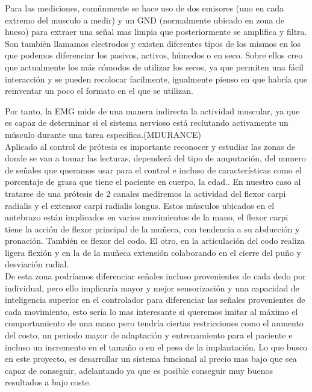 Para las mediciones, comúnmente se hace uso de dos emisores (uno en cada extremo del musculo a medir) y un GND (normalmente ubicado en zona de hueso) para extraer una señal mas limpia que posteriormente se amplifica y filtra. Son también llamamos electrodos y existen diferentes tipos de los mismos en los que podemos diferenciar los pasivos, activos, húmedos o en seco. Sobre ellos creo que actualmente los más cómodos de utilizar los secos, ya que permiten una fácil interacción y se pueden recolocar facilmente, igualmente pienso en que habría que reinventar un poco el formato en el que se utilizan.

Por tanto, la EMG mide de una manera indirecta la actividad muscular, ya que es capaz de determinar si el sistema nervioso está reclutando activamente un músculo durante una tarea específica.(MDURANCE)\\

Aplicado al control de prótesis es importante reconocer y estudiar las zonas de donde se van a tomar las lecturas, dependerá del tipo de amputación, del numero de señales que queramos usar para el control e incluso de características como el porcentaje de grasa que tiene el paciente en cuerpo, la edad.. En nuestro caso al tratarse de una prótesis de 2 canales mediremos la actividad del flexor carpi radialis y el extensor carpi radialis longus. Estos músculos ubicados en el antebrazo están implicados en varios movimientos de la mano, el flexor carpi tiene la acción de flexor principal de la muñeca, con tendencia a su abducción y pronación. También es flexor del codo. El otro, en la articulación del codo realiza ligera flexión y en la de la muñeca extensión colaborando en el cierre del puño y desviación radial.\\ 

De esta zona podríamos diferenciar señales incluso provenientes de cada dedo por individual, pero ello implicaría mayor y mejor sensorización y una capacidad de inteligencia superior en el controlador para diferenciar las señales provenientes de cada movimiento, esto sería lo mas interesante si queremos imitar al máximo el comportamiento de una mano pero tendría ciertas restricciones como el aumento del costo, un periodo mayor de adaptación y entrenamiento para el paciente e incluso un incremento en el tamaño o en el peso de la implantación. Lo que busco en este proyecto, es desarrollar un sistema funcional al precio mas bajo que sea capaz de conseguir, adelantando ya que es posible conseguir muy buenos resultados a bajo coste.

